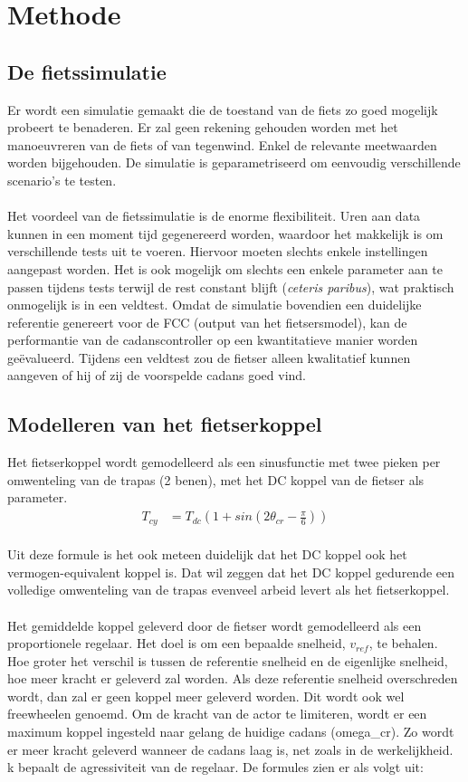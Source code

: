 \documentclass[12pt,a4paper,oneside]{book}
\begin{document}
\chapter{Methode}
\section{De fietssimulatie}
Er wordt een simulatie gemaakt die de toestand van de fiets zo goed mogelijk probeert te benaderen. Er zal geen rekening gehouden worden met het manoeuvreren van de fiets of van tegenwind. Enkel de relevante meetwaarden worden bijgehouden. De simulatie is geparametriseerd om eenvoudig verschillende scenario’s te testen.
\\\\
Het voordeel van de fietssimulatie is de enorme flexibiliteit. Uren aan data kunnen in een moment tijd gegenereerd worden, waardoor het makkelijk is om verschillende tests uit te voeren. Hiervoor moeten slechts enkele instellingen aangepast worden. Het is ook mogelijk om slechts een enkele parameter aan te passen tijdens tests terwijl de rest constant blijft (\textit{ceteris paribus}), wat praktisch onmogelijk is in een veldtest. Omdat de simulatie bovendien een duidelijke referentie genereert voor de FCC (output van het fietsersmodel), kan de performantie van de cadanscontroller op een kwantitatieve manier worden geëvalueerd. Tijdens een veldtest zou de fietser alleen kwalitatief kunnen aangeven of hij of zij de voorspelde cadans goed vind. 
\section{Modelleren van het fietserkoppel}
Het fietserkoppel wordt gemodelleerd als een sinusfunctie met twee pieken per omwenteling van de trapas (2 benen), met het DC koppel van de fietser als parameter.
\\
\begin{align*}
 T_{cy} &= T_{dc}(1+sin(2\theta_{cr}-\frac{\pi}{6}))
\end{align*}
\\
Uit deze formule is het ook meteen duidelijk dat het DC koppel ook het vermogen-equivalent koppel is. Dat wil zeggen dat het DC koppel gedurende een volledige omwenteling van de trapas evenveel arbeid levert als het fietserkoppel.
\\\\
Het gemiddelde koppel geleverd door de fietser wordt gemodelleerd als een proportionele regelaar. Het doel is om een bepaalde snelheid, $v_{ref}$, te behalen. Hoe groter het verschil is tussen de referentie snelheid en de eigenlijke snelheid, hoe meer kracht er geleverd zal worden. Als deze referentie snelheid overschreden wordt, dan zal er geen koppel meer geleverd worden. Dit wordt ook wel freewheelen genoemd. Om de kracht van de actor te limiteren, wordt er een maximum koppel ingesteld naar gelang de huidige cadans (\gls{omega_cr}). Zo wordt er meer kracht geleverd wanneer de cadans laag is, net zoals in de werkelijkheid. \gls{k} bepaalt de agressiviteit van de regelaar. De formules zien er als volgt uit:
\end{document}
